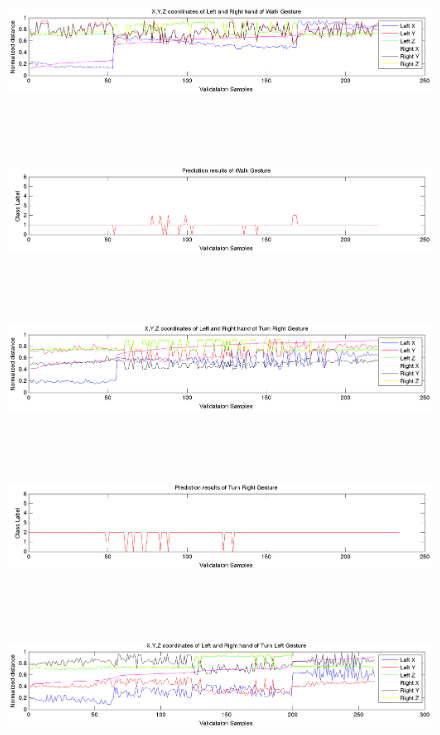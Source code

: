 \begin{figure}
	[h] \hspace{-15 mm} 
	\includegraphics[height=37mm]{figures/result/test-axis-walk.png} 
\end{figure}
\begin{figure}
	[h] \hspace{-15 mm} 
	\includegraphics[height=37mm]{figures/result/test-prediction-walk.png} 
\end{figure}
\begin{figure}
	[h] \hspace{-15 mm} 
	\includegraphics[height=37mm]{figures/result/test-axis-turn-right.png} 
\end{figure}
\begin{figure}
	[h] \hspace{-15 mm} 
	\includegraphics[height=37mm]{figures/result/test-prediction-turn-right.png} 
\end{figure}
\begin{figure}
	[h] \hspace{-15 mm} 
	\includegraphics[height=37mm]{figures/result/test-axis-turn-left.png} 
\end{figure}
